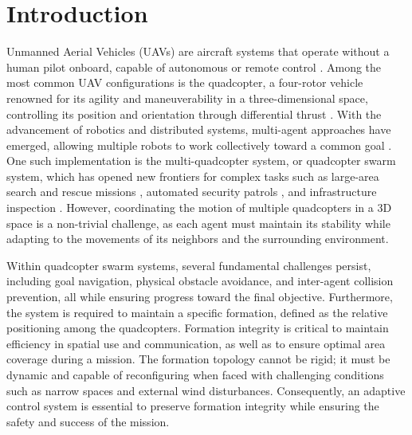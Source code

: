 \documentclass[pdflatex,sn-basic]{sn-jnl}%
\begin{document}
\maketitle

\section{Introduction}
    Unmanned Aerial Vehicles (UAVs) are aircraft systems that operate without a human pilot onboard, capable of autonomous or remote control \citep{gettinger_3_2024}. Among the most common UAV configurations is the quadcopter, a four-rotor vehicle renowned for its agility and maneuverability in a three-dimensional space, controlling its position and orientation through differential thrust \citep{brescianini_nonlinear_2013, john_bobzwikquadcopter_simcon_2025}. With the advancement of robotics and distributed systems, multi-agent approaches have emerged, allowing multiple robots to work collectively toward a common goal \citep{feng_safe_2025}. One such implementation is the multi-quadcopter system, or quadcopter swarm system, which has opened new frontiers for complex tasks such as large-area search and rescue missions \citep{hoang_drone_2023}, automated security patrols \citep{olsson_using_2024}, and infrastructure inspection \citep{jacobsen_design_2023}. However, coordinating the motion of multiple quadcopters in a 3D space is a non-trivial challenge, as each agent must maintain its stability while adapting to the movements of its neighbors and the surrounding environment. 

    Within quadcopter swarm systems, several fundamental challenges persist, including goal navigation, physical obstacle avoidance, and inter-agent collision prevention, all while ensuring progress toward the final objective. Furthermore, the system is required to maintain a specific formation, defined as the relative positioning among the quadcopters. Formation integrity is critical to maintain efficiency in spatial use and communication, as well as to ensure optimal area coverage during a mission. The formation topology cannot be rigid; it must be dynamic and capable of reconfiguring when faced with challenging conditions such as narrow spaces and external wind disturbances. Consequently, an adaptive control system is essential to preserve formation integrity while ensuring the safety and success of the mission.
\end{document}
